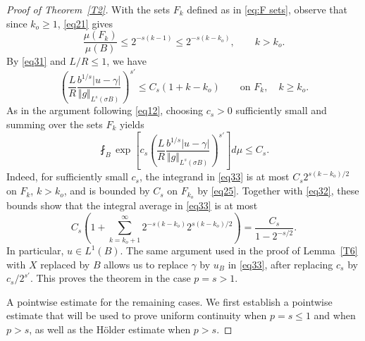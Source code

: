 \documentclass[10pt,a4paper]{amsart}
\begin{document}
\begin{proof}[Proof of Theorem~\ref{T2}]
With the sets $F_k$ defined as in \eqref{eq:F sets}, observe that
since $k_o\geq1$, \eqref{eq21} gives
\begin{equation}
\label{eq32}
 \frac{\mu(F_k)}{\mu(B)}
 \leq2^{-s(k-1)}
 \leq2^{-s(k-k_o)},
 \qquad k>k_o.
\end{equation}
By \eqref{eq31} and $L/R\leq1$, we have
\[
 \left(
 \frac LR\frac{b^{1/s}|u-\gamma|}
 {\Vert g\Vert_{L^s(\sigma B)}}
 \right)^{s'}
 \leq C_s(1+k-k_o)
 \qquad\text{on }F_k,\quad k\geq k_o.
\]
As in the argument following \eqref{eq12}, choosing $c_s>0$
sufficiently small and summing over the sets $F_k$ yields
%
\begin{equation}
\label{eq33}
 \fint_B
 \exp\!\left[
 c_s\left(
 \frac LR\frac{b^{1/s}|u-\gamma|}
 {\Vert g\Vert_{L^s(\sigma B)}}
 \right)^{s'}
 \right]d\mu
 \leq C_s.
\end{equation}
Indeed, for sufficiently small $c_s$, the integrand in
\eqref{eq33} is at most $C_s2^{s(k-k_o)/2}$ on $F_k$,
$k>k_o$, and is bounded by $C_s$ on $F_{k_o}$ by
\eqref{eq25}. Together with \eqref{eq32}, these bounds
show that the integral average in \eqref{eq33} is at most
\[
 C_s\left(
 1+\sum_{k=k_o+1}^{\infty}
 2^{-s(k-k_o)}2^{s(k-k_o)/2}
 \right)
 =\frac{C_s}{1-2^{-s/2}}.
\]
In particular, $u\in L^1(B)$. The same argument used in the proof of Lemma~\ref{T6} with $X$ replaced by $B$ allows us to replace $\gamma$ by $u_B$ in \eqref{eq33}, after replacing
$c_s$ by $c_s/2^{s'}$. This proves the theorem in the case
$p=s>1$.


\medskip
\noindent
{\sc A pointwise estimate for the remaining cases.}
We first establish a pointwise estimate that will be used to prove uniform
continuity when $p=s\leq1$ and when $p>s$, as well as the H\"older
estimate when $p>s$.


\end{proof}
\end{document}
